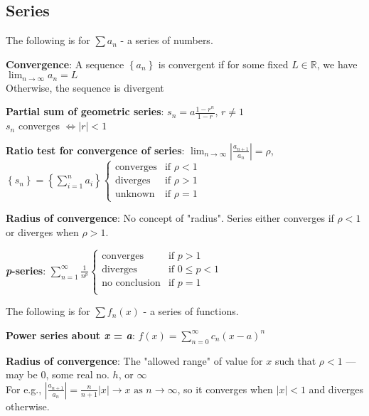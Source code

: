 \documentclass[a4paper,landscape]{article}
\newcommand{\rntopic}[1]{\section*{#1}\vspace{-0.7em}}
\newcommand{\rnname}[1]{\textbf{#1}}
\newcommand{\reals}{\mathbb{R}}
\begin{document}
\begin{multicols*}{3}
\rntopic{Series}
The following is for $\sum a_n$ - a series of numbers.
\begin{flatitemize}
\item \rnname{Convergence}: A sequence $\left\{a_n\right\}$ is convergent if for some fixed $L \in \reals$, we have $\displaystyle \lim_{n\rightarrow \infty} a_n = L$ \\
Otherwise, the sequence is divergent
\item \rnname{Partial sum of geometric series}: $\displaystyle s_n = a \frac{1-r^n}{1-r}$, $r \neq 1$ \\
$s_n$ converges $\iff \left| r \right| < 1$
\item \rnname{Ratio test for convergence of series}: 
$\displaystyle \lim_{n \rightarrow \infty} \left| \frac{a_{n+1}}{a_n} \right| = \rho$, $\displaystyle \left\{s_n\right\} = \left\{ \sum_{i=1}^{n}a_i \right\} \left\{ \begin{matrix}
\textrm{converges} & \textrm{if } \rho < 1 \\ 
\textrm{diverges} & \textrm{if } \rho > 1 \\
\textrm{unknown} & \textrm{if } \rho = 1
\end{matrix} \right.$
\item \rnname{Radius of convergence}: No concept of "radius". Series either converges if $\rho < 1$ or diverges when $\rho > 1$.
\item \rnname{\textit{p}-series}: 
$\displaystyle \sum_{n=1}^{\infty} \frac{1}{n^p} \left\{ \begin{matrix}
\textrm{converges} & \textrm{if } p > 1 \\ 
\textrm{diverges} & \textrm{if } 0 \leq p < 1 \\
\textrm{no conclusion} & \textrm{if } p = 1 \\
\end{matrix} \right.$
\end{flatitemize}
The following is for $\sum f_n(x)$ - a series of functions.
\begin{flatitemize}
\item \rnname{Power series about \textit{x} = \textit{a}}:
$\displaystyle f(x) = \displaystyle \sum_{n=0}^{\infty} c_n\left(x-a\right)^n$
\item \rnname{Radius of convergence}: The "allowed range" of value for $x$ such that $\rho < 1$ --- may be $0$, some real no. $h$, or $\infty$\\
For e.g., $\left| \frac{a_{n+1}}{a_n} \right| = \frac{n}{n+1}\left|x\right| \longrightarrow x \text{ as } n \longrightarrow\infty$, so it converges when $\left|x\right| < 1$ and diverges otherwise.

\end{flatitemize}
\end{multicols*}
\end{document}
